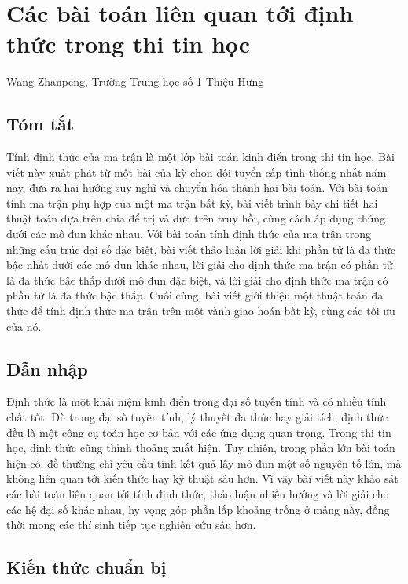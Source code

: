 \documentclass[11pt]{article}
\begin{document}
\section{Các bài toán liên quan tới định thức trong thi tin học}

\begin{center}
Wang Zhanpeng, Trường Trung học số 1 Thiệu Hưng
\end{center}

\subsection*{Tóm tắt}

Tính định thức của ma trận là một lớp bài toán kinh điển trong thi tin học. Bài
viết này xuất phát từ một bài của kỳ chọn đội tuyển cấp tỉnh thống nhất năm nay,
đưa ra hai hướng suy nghĩ và chuyển hóa thành hai bài toán. Với bài toán tính ma
trận phụ hợp của một ma trận bất kỳ, bài viết trình bày chi tiết hai thuật toán
dựa trên chia để trị và dựa trên truy hồi, cùng cách áp dụng chúng dưới các mô
đun khác nhau. Với bài toán tính định thức của ma trận trong những cấu trúc đại
số đặc biệt, bài viết thảo luận lời giải khi phần tử là đa thức bậc nhất dưới
các mô đun khác nhau, lời giải cho định thức ma trận có phần tử là đa thức bậc
thấp dưới mô đun đặc biệt, và lời giải cho định thức ma trận có phần tử là đa
thức bậc thấp. Cuối cùng, bài viết giới thiệu một thuật toán đa thức để tính
định thức ma trận trên một vành giao hoán bất kỳ, cùng các tối ưu của nó.

\subsection{Dẫn nhập}

Định thức là một khái niệm kinh điển trong đại số tuyến tính và có nhiều tính
chất tốt. Dù trong đại số tuyến tính, lý thuyết đa thức hay giải tích, định thức
đều là một công cụ toán học cơ bản với các ứng dụng quan trọng. Trong thi tin
học, định thức cũng thỉnh thoảng xuất hiện. Tuy nhiên, trong phần lớn bài toán
hiện có, đề thường chỉ yêu cầu tính kết quả lấy mô đun một số nguyên tố lớn, mà
không liên quan tới kiến thức hay kỹ thuật sâu hơn. Vì vậy bài viết này khảo sát
các bài toán liên quan tới tính định thức, thảo luận nhiều hướng và lời giải cho
các hệ đại số khác nhau, hy vọng góp phần lấp khoảng trống ở mảng này, đồng thời
mong các thí sinh tiếp tục nghiên cứu sâu hơn.

\subsection{Kiến thức chuẩn bị}
\end{document}
